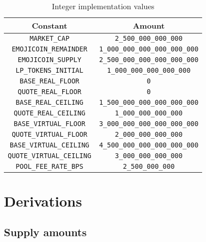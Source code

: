\documentclass[table, twocolumn]{article}
\begin{document}
\begin{table}[!htb]
  \centering
  \begin{tabular}{|c|c|}
    \hline \rowcolor{blue}
    Constant                         & Amount                                   \\ \hline
    \texttt{MARKET\_CAP}             & \texttt{2\_500\_000\_000\_000}           \\ \hline
    \texttt{EMOJICOIN\_REMAINDER}    & \texttt{1\_000\_000\_000\_000\_000\_000} \\ \hline
    \texttt{EMOJICOIN\_SUPPLY}       & \texttt{2\_500\_000\_000\_000\_000\_000} \\ \hline
    \texttt{LP\_TOKENS\_INITIAL}     & \texttt{1\_000\_000\_000\_000\_000}      \\ \hline
    \texttt{BASE\_REAL\_FLOOR}       & \texttt{0}                               \\ \hline
    \texttt{QUOTE\_REAL\_FLOOR}      & \texttt{0}                               \\ \hline
    \texttt{BASE\_REAL\_CEILING}     & \texttt{1\_500\_000\_000\_000\_000\_000} \\ \hline
    \texttt{QUOTE\_REAL\_CEILING}    & \texttt{1\_000\_000\_000\_000}           \\ \hline
    \texttt{BASE\_VIRTUAL\_FLOOR}    & \texttt{3\_000\_000\_000\_000\_000\_000} \\ \hline
    \texttt{QUOTE\_VIRTUAL\_FLOOR}   & \texttt{2\_000\_000\_000\_000}           \\ \hline
    \texttt{BASE\_VIRTUAL\_CEILING}  & \texttt{4\_500\_000\_000\_000\_000\_000} \\ \hline
    \texttt{QUOTE\_VIRTUAL\_CEILING} & \texttt{3\_000\_000\_000\_000}           \\ \hline
    \texttt{POOL\_FEE\_RATE\_BPS}    & \texttt{2\_500\_000\_000}                \\ \hline
  \end{tabular}
  \caption{Integer implementation values}
  \label{tab:integer-implementation-values}
\end{table}

\section{Derivations} \label{sec:derivations}

\subsection{Supply amounts} \label{sec:supply-amounts}
\end{document}
